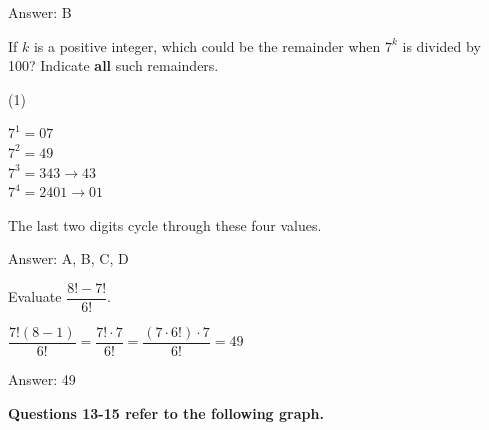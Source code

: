 \documentclass[11pt,paper=a4,answers]{exam}
\begin{document}
\begin{questions}
\begin{solution}
Answer: \colorbox{yellow!100}{B}
\end{solution}

\vspace{1cm}


\question
If $k$ is a positive integer, which could be the remainder when $7^k$ is divided by 100?
Indicate \textbf{all} such remainders.

\begin{tasks}(1)
   
\end{tasks}

\begin{solution}
\begin{center}
$7^1 = 07$ \\
$7^2 = 49$ \\
$7^3 = 343 \to 43$ \\
$7^4 = 2401 \to 01$
\end{center}
The last two digits cycle through these four values.

Answer: \colorbox{yellow!100}{A, B, C, D}
\end{solution}

\vspace{1cm}


\question
Evaluate $\dfrac{8! - 7!}{6!}$.

\begin{solution}
\begin{center}
$\dfrac{7!(8 - 1)}{6!} = \dfrac{7! \cdot 7}{6!} = \dfrac{(7 \cdot 6!) \cdot 7}{6!} = 49$
\end{center}

Answer: \colorbox{yellow!100}{49}
\end{solution}

\vspace{1cm}

\textbf{Questions 13-15 refer to the following graph.}

\begin{center}
\end{center}


\end{questions}
\end{document}
